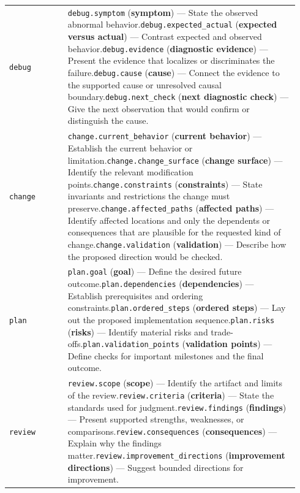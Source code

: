 \begin{longtable}{@{}L{0.19\linewidth}L{0.75\linewidth}@{}}
\texttt{debug} & \texttt{debug.symptom} (\textbf{symptom}) --- State the observed abnormal behavior.\newline{}\texttt{debug.expected\_actual} (\textbf{expected versus actual}) --- Contrast expected and observed behavior.\newline{}\texttt{debug.evidence} (\textbf{diagnostic evidence}) --- Present the evidence that localizes or discriminates the failure.\newline{}\texttt{debug.cause} (\textbf{cause}) --- Connect the evidence to the supported cause or unresolved causal boundary.\newline{}\texttt{debug.next\_check} (\textbf{next diagnostic check}) --- Give the next observation that would confirm or distinguish the cause. \\
\texttt{change} & \texttt{change.current\_behavior} (\textbf{current behavior}) --- Establish the current behavior or limitation.\newline{}\texttt{change.change\_surface} (\textbf{change surface}) --- Identify the relevant modification points.\newline{}\texttt{change.constraints} (\textbf{constraints}) --- State invariants and restrictions the change must preserve.\newline{}\texttt{change.affected\_paths} (\textbf{affected paths}) --- Identify affected locations and only the dependents or consequences that are plausible for the requested kind of change.\newline{}\texttt{change.validation} (\textbf{validation}) --- Describe how the proposed direction would be checked. \\
\texttt{plan} & \texttt{plan.goal} (\textbf{goal}) --- Define the desired future outcome.\newline{}\texttt{plan.dependencies} (\textbf{dependencies}) --- Establish prerequisites and ordering constraints.\newline{}\texttt{plan.ordered\_steps} (\textbf{ordered steps}) --- Lay out the proposed implementation sequence.\newline{}\texttt{plan.risks} (\textbf{risks}) --- Identify material risks and trade-offs.\newline{}\texttt{plan.validation\_points} (\textbf{validation points}) --- Define checks for important milestones and the final outcome. \\
\texttt{review} & \texttt{review.scope} (\textbf{scope}) --- Identify the artifact and limits of the review.\newline{}\texttt{review.criteria} (\textbf{criteria}) --- State the standards used for judgment.\newline{}\texttt{review.findings} (\textbf{findings}) --- Present supported strengths, weaknesses, or comparisons.\newline{}\texttt{review.consequences} (\textbf{consequences}) --- Explain why the findings matter.\newline{}\texttt{review.improvement\_directions} (\textbf{improvement directions}) --- Suggest bounded directions for improvement. \\

\end{longtable}
